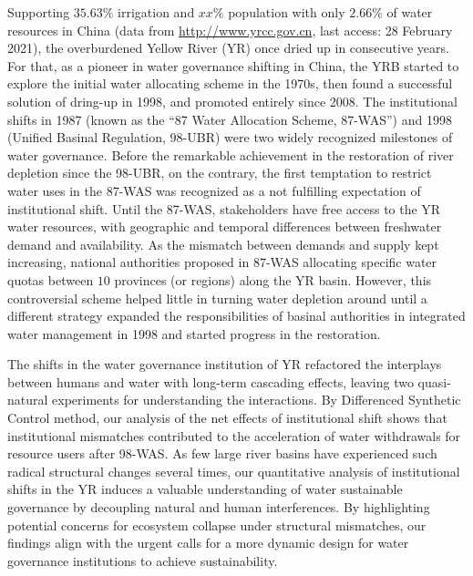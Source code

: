
Supporting $35.63\%$ irrigation and $xx\%$ population with only $2.66\%$ of water resources in China (data from \href{http://www.yrcc.gov.cn}{http://www.yrcc.gov.cn}, last access: 28 February 2021), the overburdened Yellow River (YR) once dried up in consecutive years.
For that, as a pioneer in water governance shifting in China, the YRB started to explore the initial water allocating scheme in the 1970s, then found a successful solution of dring-up in 1998, and promoted entirely since 2008.
The institutional shifts in 1987 (known as the ``87 Water Allocation Scheme, 87-WAS'') and 1998 (Unified Basinal Regulation, 98-UBR) were two widely recognized milestones of water governance.
Before the remarkable achievement in the restoration of river depletion since the 98-UBR, on the contrary, the first temptation to restrict water uses in the 87-WAS was recognized as a not fulfilling expectation of institutional shift.
Until the 87-WAS, stakeholders have free access to the YR water resources, with geographic and temporal differences between freshwater demand and availability.
As the mismatch between demands and supply kept increasing, national authorities proposed in 87-WAS allocating specific water quotas between $10$ provinces (or regions) along the YR basin.
However, this controversial scheme helped little in turning water depletion around until a different strategy expanded the responsibilities of basinal authorities in integrated water management in 1998 and started progress in the restoration.

The shifts in the water governance institution of YR refactored the interplays between humans and water with long-term cascading effects, leaving two quasi-natural experiments for understanding the interactions.
By Differenced Synthetic Control method, our analysis of the net effects of institutional shift shows that institutional mismatches contributed to the acceleration of water withdrawals for resource users after 98-WAS.
As few large river basins have experienced such radical structural changes several times, our quantitative analysis of institutional shifts in the YR induces a valuable understanding of water sustainable governance by decoupling natural and human interferences.
By highlighting potential concerns for ecosystem collapse under structural mismatches, our findings align with the urgent calls for a more dynamic design for water governance institutions to achieve sustainability.
